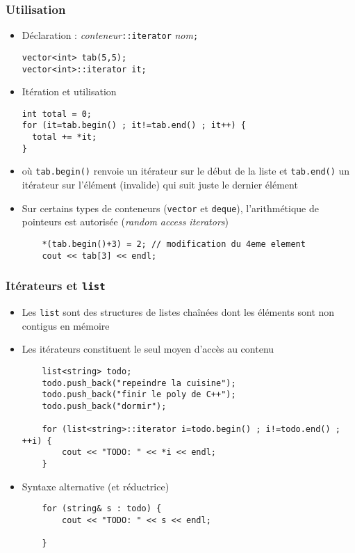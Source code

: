 \begin{frame}[fragile]\frametitle{Utilisation}
\begin{itemize}
\item Déclaration : \textit{conteneur}\texttt{::iterator} \textit{nom}\texttt{;}
\begin{lstlisting}
vector<int> tab(5,5);
vector<int>::iterator it;
\end{lstlisting}
\item Itération et utilisation
\begin{lstlisting}
int total = 0;
for (it=tab.begin() ; it!=tab.end() ; it++) {
  total += *it;
}
\end{lstlisting}
\item où \verb|tab.begin()| renvoie un itérateur sur le début de la liste et \verb|tab.end()| un itérateur sur l'élément (invalide) qui suit juste le dernier élément
\item Sur certains types de conteneurs (\verb|vector| et \verb|deque|), l'arithmétique de pointeurs est autorisée (\textit{random access iterators})
\begin{lstlisting}
    *(tab.begin()+3) = 2; // modification du 4eme element
    cout << tab[3] << endl;
\end{lstlisting}
\end{itemize}
\end{frame}

\begin{frame}[fragile]\frametitle{Itérateurs et \texttt{list}}
\begin{itemize}
\item Les \verb|list| sont des structures de listes chaînées dont les éléments sont non contigus en mémoire
\item Les itérateurs constituent le seul moyen d'accès au contenu
\begin{lstlisting}
    list<string> todo;
    todo.push_back("repeindre la cuisine");
    todo.push_back("finir le poly de C++");
    todo.push_back("dormir");

    for (list<string>::iterator i=todo.begin() ; i!=todo.end() ; ++i) {
        cout << "TODO: " << *i << endl;
    }
\end{lstlisting}
\item Syntaxe alternative (et réductrice)
\begin{lstlisting}
    for (string& s : todo) {
        cout << "TODO: " << s << endl;

    }
\end{lstlisting}
\end{itemize}
\end{frame}

